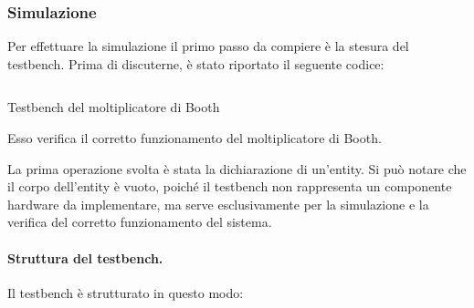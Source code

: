 \subsubsection{Simulazione}
Per effettuare la simulazione il primo passo da compiere è la stesura del testbench. Prima di discuterne, è stato riportato il seguente codice:

\begin{code}
    \inputminted{vhdl}{vhdl/booth_multiplier_tb.vhd}
    \caption{Testbench del moltiplicatore di Booth}
    \label{cod:booth_multiplier_tb}
\end{code}

Esso verifica il corretto funzionamento del moltiplicatore di Booth.

La prima operazione svolta è stata la dichiarazione di un’entity. Si può notare che il corpo dell’entity è vuoto, poiché il testbench non rappresenta un componente hardware da implementare, ma serve esclusivamente per la simulazione e la verifica del corretto funzionamento del sistema.

\paragraph{Struttura del testbench.} Il testbench è strutturato in questo modo:

